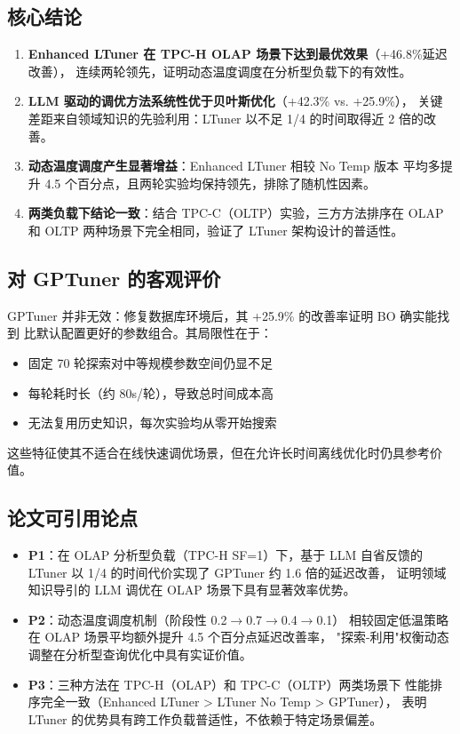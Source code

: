 \subsection{核心结论}

\begin{enumerate}
  \item \textbf{Enhanced LTuner 在 TPC-H OLAP 场景下达到最优效果}（+46.8\%延迟改善），
        连续两轮领先，证明动态温度调度在分析型负载下的有效性。
  
  \item \textbf{LLM 驱动的调优方法系统性优于贝叶斯优化}（+42.3\% vs. +25.9\%），
        关键差距来自领域知识的先验利用：LTuner 以不足 1/4 的时间取得近 2 倍的改善。
  
  \item \textbf{动态温度调度产生显著增益}：Enhanced LTuner 相较 No Temp 版本
        平均多提升 4.5 个百分点，且两轮实验均保持领先，排除了随机性因素。
  
  \item \textbf{两类负载下结论一致}：结合 TPC-C（OLTP）实验，三方方法排序在
        OLAP 和 OLTP 两种场景下完全相同，验证了 LTuner 架构设计的普适性。
\end{enumerate}

\subsection{对 GPTuner 的客观评价}

GPTuner 并非无效：修复数据库环境后，其 +25.9\% 的改善率证明 BO 确实能找到
比默认配置更好的参数组合。其局限性在于：
\begin{itemize}
  \item 固定 70 轮探索对中等规模参数空间仍显不足
  \item 每轮耗时长（约 80s/轮），导致总时间成本高
  \item 无法复用历史知识，每次实验均从零开始搜索
\end{itemize}
这些特征使其不适合在线快速调优场景，但在允许长时间离线优化时仍具参考价值。

\subsection{论文可引用论点}

\begin{itemize}
  \item[] \textbf{P1}：在 OLAP 分析型负载（TPC-H SF=1）下，基于 LLM 自省反馈的
          LTuner 以 1/4 的时间代价实现了 GPTuner 约 1.6 倍的延迟改善，
          证明领域知识导引的 LLM 调优在 OLAP 场景下具有显著效率优势。
  \item[] \textbf{P2}：动态温度调度机制（阶段性 0.2$\to$0.7$\to$0.4$\to$0.1）
          相较固定低温策略在 OLAP 场景平均额外提升 4.5 个百分点延迟改善率，
          "探索-利用"权衡动态调整在分析型查询优化中具有实证价值。
  \item[] \textbf{P3}：三种方法在 TPC-H（OLAP）和 TPC-C（OLTP）两类场景下
          性能排序完全一致（Enhanced LTuner > LTuner No Temp > GPTuner），
          表明 LTuner 的优势具有跨工作负载普适性，不依赖于特定场景偏差。
\end{itemize}
